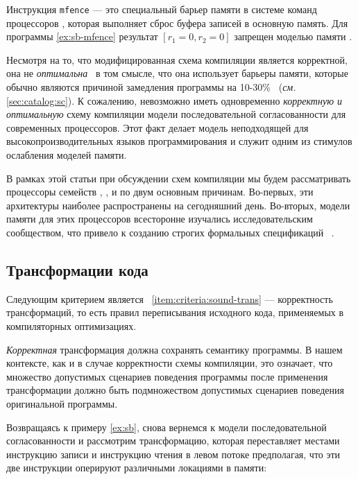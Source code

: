 Инструкция \texttt{mfence} --- это специальный барьер памяти в системе команд процессоров 
\Intel, которая выполняет сброс буфера записей в основную память. 
Для программы \ref{ex:sb-mfence} результат ${[r_1=0, r_2=0]}$
запрещен моделью памяти \Intel. 

Несмотря на то, что модифицированная схема компиляции является корректной, 
она не \emph{оптимальна}~\cite{OptimalCompilationCPP}
в том смысле, что она использует барьеры памяти,
которые обычно являются причиной замедления программы 
на 10-30\%~\cite{Marino-al:PLDI11, Liu-al:OOPSLA17}
(\emph{см.} \cref{sec:catalog:sc}).
К сожалению, невозможно иметь одновременно \emph{корректную и оптимальную} 
схему компиляции модели последовательной согласованности 
для современных процессоров. 
Этот факт делает модель \SC неподходящей 
для высокопроизводительных языков программирования 
и служит одним из стимулов ослабления моделей памяти. 

В рамках этой статьи при обсуждении 
схем компиляции мы будем рассматривать процессоры семейств
\Intel, ,  и \POWER 
по двум основным причинам. 
Во-первых, эти архитектуры наиболее 
распространены на сегодняшний день. 
Во-вторых, модели памяти для этих процессоров 
всесторонне изучались исследовательским сообществом, 
что привело к созданию строгих 
формальных спецификаций~%
\cite{Sewell-al:CACM10, Sarkar-al:PLDI11, 
Flur-al:POPL16, Pulte-al:POPL18}. 

\subsection{Трансформации кода}
\label{sec:background:trans}

Следующим критерием является ~\ref{item:criteria:sound-trans} ---
корректность трансформаций, то есть правил переписывания 
исходного кода, применяемых в компиляторных оптимизациях. 

\emph{Корректная} трансформация должна сохранять семантику программы. 
В нашем контексте, как и в случае корректности схемы компиляции,
это означает, что множество допустимых сценариев поведения 
программы после применения трансформации должно 
быть подмножеством допустимых сценариев поведения оригинальной программы.

Возвращаясь к примеру \ref{ex:sb},
снова вернемся к модели последовательной согласованности 
и рассмотрим трансформацию, которая переставляет местами инструкцию записи и инструкцию чтения в левом потоке предполагая, что эти две инструкции 
оперируют различными локациями в памяти:

